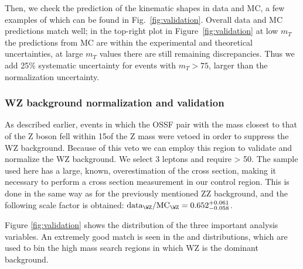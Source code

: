 Then, we check the prediction of the kinematic shapes in data and MC,
a few examples of which can be found in
Fig.~\ref{fig:validation}. Overall data and MC predictions match well;
in the top-right plot in Figure~\ref{fig:validation} at low $m_T$ the
predictions from MC are within the experimental and theoretical
uncertainties, at large $m_T$ values there are still remaining
discrepancies. Thus we add 25\% systematic uncertainty for events with
$m_T> 75$\GeV, larger than the normalization uncertainty.

\subsubsection{WZ background normalization and validation}\label{sec:promptwz}
As described earlier, events in which the OSSF pair with the mass
closest to that of the Z boson fell within 15\GeV of the Z mass were
vetoed in order to suppress the WZ background. Because of this veto we
can employ this region to validate and normalize the WZ background. We
select 3 \ti  leptons and require \ptmiss> 50\GeV.
The sample used here has a large, known, overestimation of
the cross section, making it necessary to perform a cross section
measurement in our control region. This is done in the same way as for
the previously mentioned ZZ background, and the following scale factor
is obtained: $\text{data}_{\WZ}/\text{MC}_{\WZ}= 0.652_{-0.058}^{+0.061}$.

Figure \ref{fig:validation} shows the distribution of the three
important analysis variables. An extremely good match is seen in the
\mmin  and \mtmin  distributions, which are used to bin the high mass
search regions in which WZ is the dominant background.


